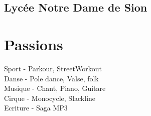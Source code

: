 \documentclass[]{cv-template}
\begin{document}
\begin{minipage}[t]{0.34\textwidth}
\subsection{Lycée Notre Dame de Sion}
\sectionsep



\section{Passions}
Sport - Parkour, StreetWorkout \\
Danse - Pole dance, Valse, folk \\
Musique - Chant, Piano, Guitare\\
Cirque - Monocycle, Slackline\\
Ecriture - Saga MP3
\sectionsep





%
%
\end{minipage}
\end{document}
